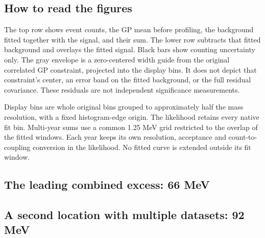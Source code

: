 \subsection*{How to read the figures}
The top row shows event counts, the GP mean before profiling, the background fitted together with the signal, and their sum. The lower row subtracts that fitted background and overlays the fitted signal. Black bars show counting uncertainty only. The gray envelope is a zero-centered width guide from the original correlated GP constraint, projected into the display bins. It does not depict that constraint's center, an error band on the fitted background, or the full residual covariance. These residuals are not independent significance measurements.

Display bins are whole original bins grouped to approximately half the mass resolution, with a fixed histogram-edge origin. The likelihood retains every native fit bin. Multi-year sums use a common 1.25 MeV grid restricted to the overlap of the fitted windows. Each year keeps its own resolution, acceptance and count-to-coupling conversion in the likelihood. No fitted curve is extended outside its fit window.

\clearpage
\begin{landscape}
\subsection*{The leading combined excess: 66 MeV}

\end{landscape}

\clearpage
\begin{landscape}
\subsection*{A second location with multiple datasets: 92 MeV}

\end{landscape}

